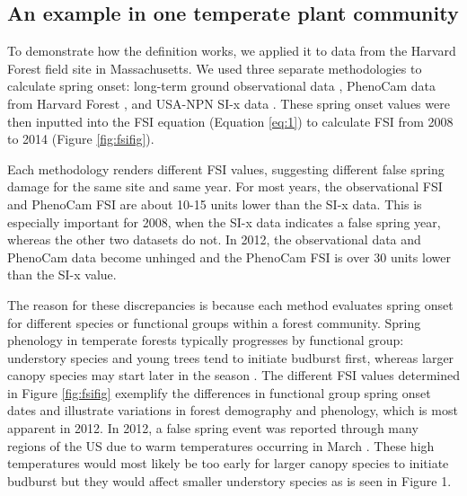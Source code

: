 \documentclass{article}\usepackage[]{graphicx}\usepackage[]{color}
\begin{document}
\subsection{An example in one temperate plant community} %
To demonstrate how the definition works, we applied it to data from the Harvard Forest field site in Massachusetts. We used three separate methodologies to calculate spring onset: long-term ground observational data \citep{Okeefe2014}, PhenoCam data from Harvard Forest \citep{Richardson2015}, and USA-NPN SI-x data \citep{USA-NPN2016}. These spring onset values were then inputted into the FSI equation (Equation \ref{eq:1}) to calculate FSI from 2008 to 2014 (Figure \ref{fig:fsifig}). 

Each methodology renders different FSI values, suggesting different false spring damage for the same site and same year. For most years, the observational FSI and PhenoCam FSI are about 10-15 units lower than the SI-x data. This is especially important for 2008, when the SI-x data indicates a false spring year, whereas the other two datasets do not. In 2012, the observational data and PhenoCam data become unhinged and the PhenoCam FSI is over 30 units lower than the SI-x value.

The reason for these discrepancies is because each method evaluates spring onset for different species or functional groups within a forest community. Spring phenology in temperate forests typically progresses by functional group: understory species and young trees tend to initiate budburst first, whereas larger canopy species may start later in the season \citep{Richardson2009, Xin2016}. The different FSI values determined in Figure \ref{fig:fsifig} exemplify the differences in functional group spring onset dates and illustrate variations in forest demography and phenology, which is most apparent in 2012. In 2012, a false spring event was reported through many regions of the US due to warm temperatures occurring in March \citep{Ault2015}. These high temperatures would most likely be too early for larger canopy species to initiate budburst but they would affect smaller understory species as is seen in Figure 1. 
\end{document}
